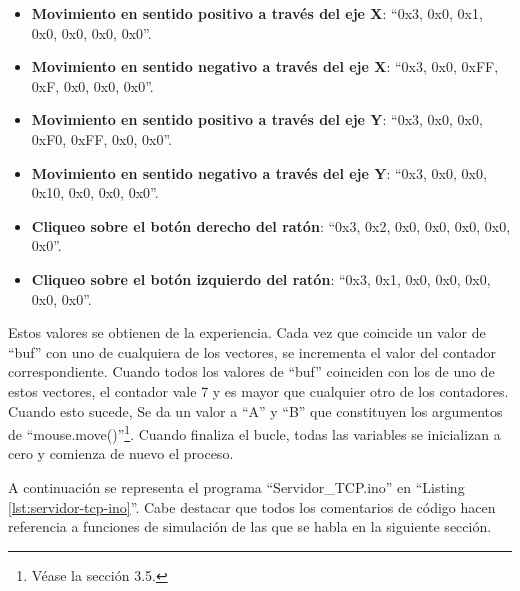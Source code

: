 \begin{itemize}
    \item {\bfseries Movimiento en sentido positivo a través del eje X}: ``{0x3, 0x0, 0x1, 0x0, 0x0, 0x0, 0x0}''.
    \item {\bfseries Movimiento en sentido negativo a través del eje X}: ``{0x3, 0x0, 0xFF, 0xF, 0x0, 0x0, 0x0}''.
    \item {\bfseries Movimiento en sentido positivo a través del eje Y}: ``{0x3, 0x0, 0x0, 0xF0, 0xFF, 0x0, 0x0}''.
    \item {\bfseries Movimiento en sentido negativo a través del eje Y}: ``{0x3, 0x0, 0x0, 0x10, 0x0, 0x0, 0x0}''.
    \item {\bfseries Cliqueo sobre el botón derecho del ratón}: ``{0x3, 0x2, 0x0, 0x0, 0x0, 0x0, 0x0}''.
    \item {\bfseries Cliqueo sobre el botón izquierdo del ratón}: ``{0x3, 0x1, 0x0, 0x0, 0x0, 0x0, 0x0}''.
\end{itemize}

Estos valores se obtienen de la experiencia.
Cada vez que coincide un valor de ``buf'' con uno de cualquiera de los vectores, se incrementa el valor del contador correspondiente.
Cuando todos los valores de ``buf'' coinciden con los de uno de estos vectores, el contador vale 7 y es mayor que cualquier otro de los contadores. Cuando esto sucede, Se da un valor a ``A'' y ``B'' que constituyen los argumentos de ``mouse.move()''\footnote{Véase la sección 3.5.}. Cuando finaliza el bucle, todas las variables se inicializan a cero y comienza de nuevo el proceso. 

A continuación se representa el programa ``Servidor\_TCP.ino'' en ``Listing \ref{lst:servidor-tcp-ino}''. Cabe destacar que todos los comentarios de código hacen referencia a funciones de simulación de las que se habla en la siguiente sección.



